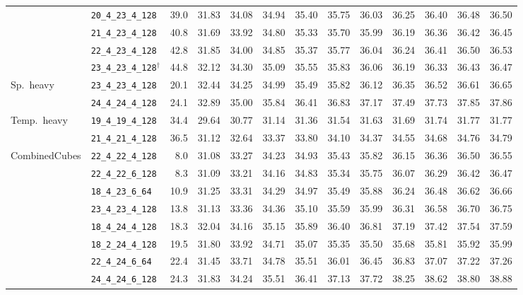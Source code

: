 \documentclass[12pt, a4paper, twoside]{report}
\begin{document}
\begin{table}[htbp]
\begin{adjustwidth}{-3cm}{-1cm}
\begin{tabular}{llrrrrrrrrrrr}
   & \texttt{20\_4\_23\_4\_128} & 39.0 & 31.83 & 34.08 & 34.94 & 35.40 & 35.75 & 36.03 & 36.25 & 36.40 & 36.48 & 36.50 \\
   & \texttt{21\_4\_23\_4\_128} & 40.8 & 31.69 & 33.92 & 34.80 & 35.33 & 35.70 & 35.99 & 36.19 & 36.36 & 36.42 & 36.45 \\
   & \texttt{22\_4\_23\_4\_128} & 42.8 & 31.85 & 34.00 & 34.85 & 35.37 & 35.77 & 36.04 & 36.24 & 36.41 & 36.50 & 36.53 \\
   & \texttt{23\_4\_23\_4\_128}$^\dagger$ & 44.8 & 32.12 & 34.30 & 35.09 & 35.55 & 35.83 & 36.06 & 36.19 & 36.33 & 36.43 & 36.47 \\
\addlinespace
  Sp.~heavy & \texttt{23\_4\_23\_4\_128} & 20.1 & 32.44 & 34.25 & 34.99 & 35.49 & 35.82 & 36.12 & 36.35 & 36.52 & 36.61 & 36.65 \\
   & \texttt{24\_4\_24\_4\_128} & 24.1 & 32.89 & 35.00 & 35.84 & 36.41 & 36.83 & 37.17 & 37.49 & 37.73 & 37.85 & 37.86 \\
\addlinespace
  Temp.~heavy & \texttt{19\_4\_19\_4\_128} & 34.4 & 29.64 & 30.77 & 31.14 & 31.36 & 31.54 & 31.63 & 31.69 & 31.74 & 31.77 & 31.77 \\
   & \texttt{21\_4\_21\_4\_128} & 36.5 & 31.12 & 32.64 & 33.37 & 33.80 & 34.10 & 34.37 & 34.55 & 34.68 & 34.76 & 34.79 \\
\addlinespace
  CombinedCubes & \texttt{22\_4\_22\_4\_128} & 8.0 & 31.08 & 33.27 & 34.23 & 34.93 & 35.43 & 35.82 & 36.15 & 36.36 & 36.50 & 36.55 \\
   & \texttt{22\_4\_22\_6\_128} & 8.3 & 31.09 & 33.21 & 34.16 & 34.83 & 35.34 & 35.75 & 36.07 & 36.29 & 36.42 & 36.47 \\
   & \texttt{18\_4\_23\_6\_64} & 10.9 & 31.25 & 33.31 & 34.29 & 34.97 & 35.49 & 35.88 & 36.24 & 36.48 & 36.62 & 36.66 \\
   & \texttt{23\_4\_23\_4\_128} & 13.8 & 31.13 & 33.36 & 34.36 & 35.10 & 35.59 & 35.99 & 36.31 & 36.58 & 36.70 & 36.75 \\
   & \texttt{18\_4\_24\_4\_128} & 18.3 & 32.04 & 34.16 & 35.15 & 35.89 & 36.40 & 36.81 & 37.19 & 37.42 & 37.54 & 37.59 \\
   & \texttt{18\_2\_24\_4\_128} & 19.5 & 31.80 & 33.92 & 34.71 & 35.07 & 35.35 & 35.50 & 35.68 & 35.81 & 35.92 & 35.99 \\
   & \texttt{22\_4\_24\_6\_64} & 22.4 & 31.45 & 33.71 & 34.78 & 35.51 & 36.01 & 36.45 & 36.83 & 37.07 & 37.22 & 37.26 \\
   & \texttt{24\_4\_24\_6\_128} & 24.3 & 31.83 & 34.24 & 35.51 & 36.41 & 37.13 & 37.72 & 38.25 & 38.62 & 38.80 & 38.88 \\

\end{tabular}
\end{adjustwidth}
\end{table}
\end{document}

